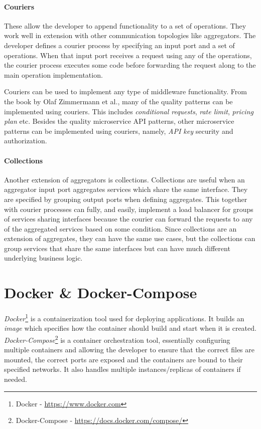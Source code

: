 \paragraph{Couriers} These allow the developer to append functionality to a set of operations. They work well in extension with other communication topologies like aggregators.
The developer defines a courier process by specifying an input port and a set of operations. When that input port receives a request using any of the operations, 
the courier process executes some code before forwarding the request along to the main operation implementation.

Couriers can be used to implement any type of middleware functionality. From the book by Olaf Zimmermann et al., many of the quality patterns can be implemented using couriers. This includes
\emph{conditional requests}, \emph{rate limit}, \emph{pricing plan} etc. Besides the quality microservice API patterns, other microservice patterns can be implemented using couriers, namely, \emph{API key} security and authorization.

\paragraph{Collections} Another extension of aggregators is collections. Collections are useful when an aggregator input port aggregates services which share the same interface.
They are specified by grouping output ports when defining aggregates.
This together with courier processes can fully, and easily, implement a load balancer for groups of services sharing interfaces because the courier can forward the requests to any of the aggregated services based on some condition.
Since collections are an extension of aggregates, they can have the same use cases, but the collections can group services that share the same interfaces but can have much different underlying business logic.

\section{Docker \& Docker-Compose}
\emph{Docker}\footnote{Docker - \url{https://www.docker.com}} is a containerization tool used for deploying applications. It builds an \emph{image} which specifies how the container should build and start when it is created.
\emph{Docker-Compose}\footnote{Docker-Compose - \url{https://docs.docker.com/compose/}} is a container orchestration tool, essentially configuring multiple containers and allowing the developer to ensure that the correct files are mounted, the correct ports are exposed and the containers are bound to their specified networks. It also handles multiple instances/replicas
of containers if needed.

